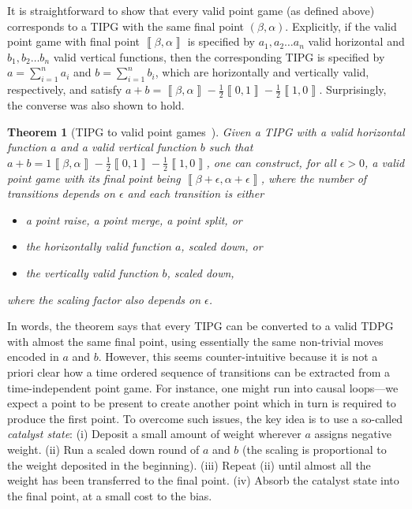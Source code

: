 \documentclass{article}
\newtheorem{theorem}{Theorem}\newtheorem{lemma}[theorem]{Lemma}\newtheorem{proposition}[theorem]{Proposition}\newtheorem{corollary}[theorem]{Corollary}\newtheorem{definition}[theorem]{Definition}\newtheorem{claim}[theorem]{Claim}\newtheorem{remark}[theorem]{Remark}\newtheorem{example}[theorem]{Example}
\newcommand{\atul}[1]{#1} %
\begin{document}
%

It is straightforward to show that every valid point game (as defined above) corresponds to a TIPG with the same final point $(\beta,\alpha)$. %
Explicitly, if the valid point game with final point $\left\llbracket \beta,\alpha\right\rrbracket $
is specified by $a_{1},a_{2}\dots a_{n}$ valid horizontal and $b_{1},b_{2}\dots b_{n}$ valid vertical functions,
then the corresponding TIPG is specified by $a=\sum_{i=1}^{n}a_{i}$
and $b=\sum_{i=1}^{n}b_{i}$, which are horizontally and vertically
valid, respectively, and satisfy $a+b=\left\llbracket \beta,\alpha\right\rrbracket -\frac{1}{2}\left\llbracket 0,1\right\rrbracket -\frac{1}{2}\left\llbracket 1,0\right\rrbracket $. Surprisingly, the converse was also shown to hold.

\begin{theorem}[TIPG to valid point games~\cite{Mochon07,ACG+14}]
  Given a TIPG with a valid horizontal function $a$ and a valid vertical
  function $b$ such that $a+b=1\left\llbracket\beta,\alpha\right\rrbracket-\frac{1}{2}\left\llbracket0,1\right\rrbracket-\frac{1}{2}\left\llbracket1,0\right\rrbracket$,
  one can construct, for all $\epsilon>0$, a valid point game with its final
  point being $\left\llbracket\beta+\epsilon,\alpha+\epsilon\right\rrbracket$, where the number of transitions
  depends on $\epsilon$ \atul{
    and each transition is either}
  \begin{itemize}
    \item \atul{
            a point raise, a point merge, a point split, or}
    \item \atul{
            the horizontally valid function $a$, scaled down, or}
    \item \atul{
            the vertically valid function $b$, scaled down,}
  \end{itemize} %
  \atul{
    where the scaling factor also depends on $\epsilon$.}
  \label{thm:TIPG-to-valid-point-games}
\end{theorem}

%

%
%
%
%
%
%
%

In words, the theorem says that every TIPG can be converted to a valid TDPG with almost the same final point\atul{, using essentially the same non-trivial moves encoded in $a$ and $b$}. However, this seems counter-intuitive because it is not a priori clear how a time ordered sequence of transitions can be extracted from a time-independent point game. For instance, one might run into causal loops---we expect a point to be present to create another point which in turn is required to produce the first point. To overcome such issues, the key idea is to use a so-called \emph{catalyst state}: (i) Deposit a small amount of weight wherever $a$ assigns negative weight. (ii) Run a scaled down round of $a$ and $b$ (the scaling is proportional to the weight deposited in the beginning). (iii) Repeat (ii) until almost all the weight has been transferred to the final point. (iv) Absorb the catalyst state \atul{into the final point,} at a small cost to the bias.
\end{document}
